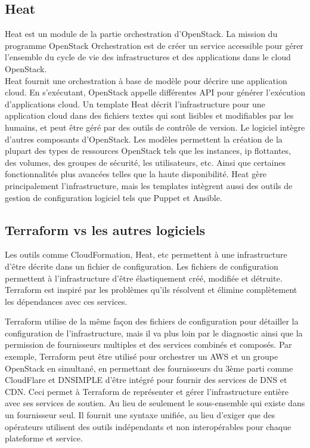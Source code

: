 \documentclass[]{article}
\begin{document}
\subsection{Heat}\label{heat}
Heat est un module de la partie orchestration d'OpenStack. La mission du
programme OpenStack Orchestration est de créer un service accessible
pour gérer l'ensemble du cycle de vie des infrastructures et des
applications dans le cloud OpenStack. \\
Heat fournit une orchestration à
base de modèle pour décrire une application cloud. En s'exécutant,
OpenStack appelle différentes API pour générer l'exécution d'applications
cloud. Un template Heat décrit l'infrastructure pour une application
cloud dans des fichiers textes qui sont lisibles et modifiables par les
humains, et peut être géré par des outils de contrôle de version. Le
logiciel intègre d'autres composants d'OpenStack. Les modèles permettent
la création de la plupart des types de ressources OpenStack tels que les
instances, ip flottantes, des volumes, des groupes de sécurité, les
utilisateurs, etc. Ainsi que certaines fonctionnalités plus avancées
telles que la haute disponibilité. Heat gère principalement
l'infrastructure, mais les templates intègrent aussi des outils de
gestion de configuration logiciel tels que Puppet et Ansible.

\subsection{Terraform vs les autres
logiciels}\label{terraform-vs-les-autres-logiciels}
Les outils comme CloudFormation, Heat, etc permettent à une
infrastructure d'être décrite dans un fichier de configuration. Les
fichiers de configuration permettent à l'infrastructure d'être
élastiquement créé, modifiée et détruite.
 Terraform est inspiré par les
problèmes qu'ils résolvent et élimine complètement les dépendances avec ces services.

Terraform utilise de la même façon des fichiers de configuration pour
détailler la configuration de l'infrastructure, mais il va plus loin par
le diagnostic ainsi que la permission de fournisseurs multiples et des
services combinés et composés. Par exemple, Terraform peut être utilisé
pour orchestrer un AWS et un groupe OpenStack en simultané, en
permettant des fournisseurs du 3ème parti comme CloudFlare et DNSIMPLE
d'être intégré pour fournir des services de DNS et CDN. Ceci permet à
Terraform de représenter et gérer l'infrastructure entière avec ses
services de soutien. Au lieu de seulement le sous-ensemble qui existe
dans un fournisseur seul. Il fournit une syntaxe unifiée, au lieu
d'exiger que des opérateurs utilisent des outils indépendants et
non interopérables pour chaque plateforme et service.
\end{document}
